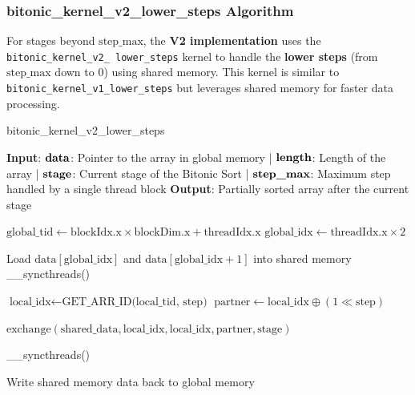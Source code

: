 \documentclass[12pt]{article}
\begin{document}
\subsubsection{bitonic\_kernel\_v2\_lower\_steps Algorithm}

For stages beyond \( \text{step\_max} \), the \textbf{V2 implementation} uses the \texttt{bitonic\_kernel\_v2\_ lower\_steps} kernel to handle the \textbf{lower steps} (from \( \text{step\_max} \) down to 0) using shared memory. This kernel is similar to \texttt{bitonic\_kernel\_v1\_lower\_steps} but leverages shared memory for faster data processing.

\begin{algorithm}[H]
\caption{bitonic\_kernel\_v2\_lower\_steps}\label{alg:v2_lower_steps}
\begin{algorithmic}[1]
\Require \textbf{Input}: 
    \( \text{\textbf{data}} \): Pointer to the array in global memory |  
    \( \text{\textbf{length}} \): Length of the array | 
    \( \text{\textbf{stage}} \): Current stage of the Bitonic Sort | 
    \( \text{\textbf{step\_max}} \): Maximum step handled by a single thread block
\Ensure \textbf{Output}: Partially sorted array after the current stage

\State \( \text{global\_tid} \gets \text{blockIdx.x} \times \text{blockDim.x} + \text{threadIdx.x} \) 
\State \( \text{global\_idx} \gets \text{threadIdx.x} \times 2 \)

\State Load \( \text{data}[ \text{global\_idx} ] \) and \( \text{data}[ \text{global\_idx} + 1 ] \) into shared memory
\State \_\_syncthreads() 

    \State \( \text{local\_idx} \gets \text{GET\_ARR\_ID(local\_tid, step)} \) 
    \State \( \text{partner} \gets \text{local\_idx} \oplus (1 \ll \text{step}) \) 
    
        
        \State \( \text{exchange}(\text{shared\_data}, \text{local\_idx}, \text{local\_idx}, \text{partner}, \text{stage}) \) 
    \EndIf
    
    \State \_\_syncthreads() 
\EndFor

\State Write shared memory data back to global memory
\end{algorithmic}
\end{algorithm}
\end{document}

